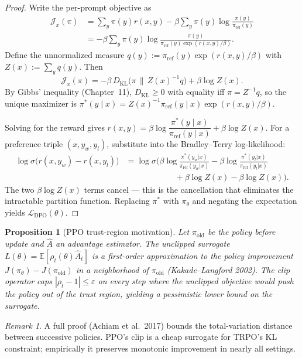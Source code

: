 \documentclass[11pt]{article}
\newtheorem{proposition}[theorem]{Proposition}
\theoremstyle{remark}
\newtheorem{remark}[theorem]{Remark}
\begin{document}
\begin{proof}
Write the per-prompt objective as
\begin{align*}
\mathcal{J}_x(\pi)
&= \sum_y\pi(y)r(x,y) - \beta\sum_y\pi(y)\log\frac{\pi(y)}{\pi_{\mathrm{ref}}(y)} \\
&= -\beta\sum_y\pi(y)\log\frac{\pi(y)}{\pi_{\mathrm{ref}}(y)\exp(r(x,y)/\beta)}.
\end{align*}
Define the unnormalized measure $q(y):=\pi_{\mathrm{ref}}(y)\exp(r(x,y)/\beta)$ with $Z(x):=\sum_y q(y)$. Then
\[
\mathcal{J}_x(\pi) = -\beta\,D_{\mathrm{KL}}\!\big(\pi\,\|\,Z(x)^{-1}q\big) + \beta\log Z(x).
\]
By Gibbs' inequality (Chapter~11), $D_{\mathrm{KL}}\geq 0$ with equality iff $\pi=Z^{-1}q$, so the unique maximizer is
$\pi^*(y\mid x) = Z(x)^{-1}\pi_{\mathrm{ref}}(y\mid x)\exp(r(x,y)/\beta)$.

Solving for the reward gives
$r(x,y) = \beta\log\!\dfrac{\pi^*(y\mid x)}{\pi_{\mathrm{ref}}(y\mid x)} + \beta\log Z(x).$
For a preference triple $(x,y_w,y_l)$, substitute into the Bradley--Terry log-likelihood:
\begin{align*}
\log\sigma\!\big(r(x,y_w)-r(x,y_l)\big)
&= \log\sigma\!\Bigg(\beta\log\frac{\pi^*(y_w|x)}{\pi_{\mathrm{ref}}(y_w|x)} - \beta\log\frac{\pi^*(y_l|x)}{\pi_{\mathrm{ref}}(y_l|x)} \\
&\hspace{6em}+\beta\log Z(x)-\beta\log Z(x)\Bigg).
\end{align*}
The two $\beta\log Z(x)$ terms cancel --- this is the cancellation that eliminates the intractable partition function. Replacing $\pi^*$ with $\pi_\theta$ and negating the expectation yields $\mathcal{L}_{\mathrm{DPO}}(\theta)$.
\end{proof}

\begin{proposition}[PPO trust-region motivation]
Let $\pi_{\mathrm{old}}$ be the policy before update and $\hat A$ an advantage estimator. The unclipped surrogate $L(\theta)=\mathbb{E}[\rho_t(\theta)\hat A_t]$ is a first-order approximation to the policy improvement $J(\pi_\theta)-J(\pi_{\mathrm{old}})$ in a neighborhood of $\pi_{\mathrm{old}}$ (Kakade--Langford 2002). The clip operator caps $|\rho_t-1|\le\varepsilon$ on every step where the unclipped objective would push the policy out of the trust region, yielding a pessimistic lower bound on the surrogate.
\end{proposition}

\begin{remark}
A full proof (Achiam et al.\ 2017) bounds the total-variation distance between successive policies. PPO's clip is a cheap surrogate for TRPO's KL constraint; empirically it preserves monotonic improvement in nearly all settings.
\end{remark}
\end{document}
